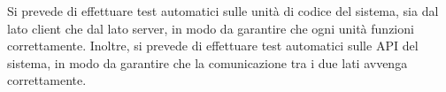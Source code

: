 Si prevede di effettuare test automatici sulle unità di codice del sistema, sia dal lato client che dal lato server, in modo da garantire che ogni unità funzioni correttamente. Inoltre, si prevede di effettuare test automatici sulle API del sistema, in modo da garantire che la comunicazione tra i due lati avvenga correttamente.